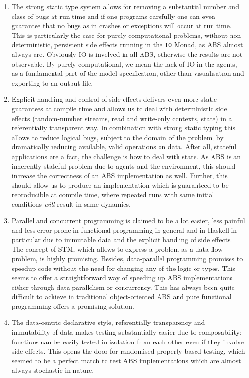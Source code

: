 \begin{enumerate}
	\item The strong static type system allows for removing a substantial number and class of bugs at run time and if one programs carefully one can even guarantee that no bugs as in crashes or exceptions will occur at run time. This is particularly the case for purely computational problems, without non-deterministic, persistent side effects running in the \texttt{IO} Monad, as ABS almost always are. Obviously IO is involved in all ABS, otherwise the results are not observable. By purely computational, we mean the lack of IO in the agents, as a fundamental part of the model specification, other than visualisation and exporting to an output file.
	
	\item Explicit handling and control of side effects delivers even more static guarantees at compile time and allows us to deal with deterministic side effects (random-number streams, read and write-only contexts, state) in a referentially transparent way. In combination with strong static typing this allows to reduce logical bugs, subject to the domain of the problem, by dramatically reducing available, valid operations on data. After all, stateful applications are a fact, the challenge is how to deal with state. As ABS is an inherently stateful problem due to agents and the environment, this should increase the correctness of an ABS implementation as well. Further, this should allow us to produce an implementation which is guaranteed to be reproducible at compile time, where repeated runs with same initial conditions \textit{will} result in same dynamics.
	
	\item Parallel and concurrent programming is claimed to be a lot easier, less painful and less error prone in functional programming in general and in Haskell in particular due to immutable data and the explicit handling of side effects. The concept of STM, which allows to express a problem as a data-flow problem, is highly promising. Besides, data-parallel programming promises to speedup code without the need for changing any of the logic or types. This seems to offer a straightforward way of speeding up ABS implementations either through data parallelism or concurrency. This has always been quite difficult to achieve in traditional object-oriented ABS and pure functional programming offers a promising solution.
	
	\item The data-centric declarative style, referentially transparency and immutability of data makes testing substantially easier due to composability: functions can be easily tested in isolation from each other even if they involve side effects. This opens the door for randomised property-based testing, which seemed to be a perfect match to test ABS implementations which are almost always stochastic in nature.
\end{enumerate}


